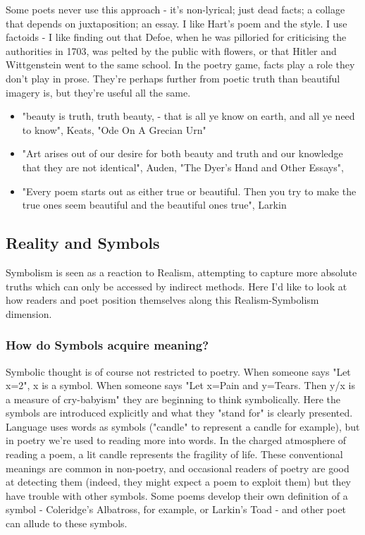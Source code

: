 \documentclass[11pt]{article}
\begin{document}
Some poets never use this approach - it's non-lyrical; just dead facts; a collage that depends on juxtaposition; an essay. I like Hart's poem and the style. I use factoids - I like finding out that Defoe, when he was pilloried for criticising the authorities in 1703, was pelted by the public with flowers, or that Hitler and Wittgenstein went to the same school. In the poetry game, facts play a role they don't play in prose. They're perhaps further from poetic truth than beautiful imagery is, but they're useful all the same.
\begin{itemize}
\item    "beauty is truth, truth beauty, - that is all ye know on earth, and all ye need to know", Keats, "Ode On A Grecian Urn"
\item    "Art arises out of our desire for both beauty and truth and our knowledge that they are not identical", Auden, "The Dyer's Hand and Other Essays",
\item    "Every poem starts out as either true or beautiful. Then you try to make the true ones seem beautiful and the beautiful ones true", Larkin
\end{itemize}

\newpage\subsection{Reality and Symbols}
Symbolism is seen as a reaction to Realism, attempting to capture more absolute truths which can only be accessed by indirect methods. Here I'd like to look at how readers and poet position themselves along this Realism-Symbolism dimension.

\subsubsection*{How do Symbols acquire meaning?}

Symbolic thought is of course not restricted to poetry. When someone says "Let x=2", x is a symbol. When someone says "Let x=Pain and y=Tears. Then y/x is a measure of cry-babyism" they are beginning to think symbolically. Here the symbols are introduced explicitly and what they "stand for" is clearly presented. Language uses words as symbols ("candle" to represent a candle for example), but in poetry we're used to reading more into words. In the charged atmosphere of reading a poem, a lit candle represents the fragility of life. These conventional meanings are common in non-poetry, and occasional readers of poetry are good at detecting them (indeed, they might expect a poem to exploit them) but they have trouble with other symbols. Some poems develop their own definition of a symbol - Coleridge's Albatross, for example, or Larkin's Toad - and other poet can allude to these symbols.
\end{document}
